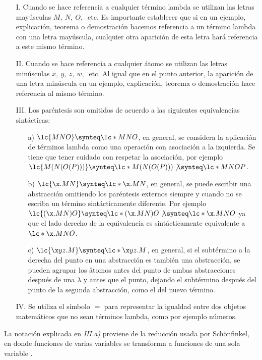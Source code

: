 \begin{itemize}
\item[I.] Cuando se hace referencia a cualquier término lambda se utilizan las
  letras mayúsculas \(M,\ N,\ O,\ \) etc. Es importante establecer que si en un
  ejemplo, explicación, teorema o demostración hacemos referencia a un término
  lambda con una letra mayúscula, cualquier otra aparición de esta letra hará
  referencia a este mismo término.
\item[II.] Cuando se hace referencia a cualquier átomo se utilizan las letras
  minúsculas \(x,\ y,\ z,\ w,\ \) etc. Al igual que en el punto anterior, la
  aparición de una letra minúscula en un ejemplo, explicación, teorema o
  demostración hace referencia al mismo término.
\item[III.] Los paréntesis son omitidos de acuerdo a las siguientes
  equivalencias sintácticas:
  \begin{itemize}
  \item[a)] \(\lc{M N O} \synteq \lc*{M N O}\), en general, se considera la
    aplicación de términos lambda como una operación con asociación a la
    izquierda. Se tiene que tener cuidado con respetar la asociación, por
    ejemplo \(\lc{M(N(O(P)))} \synteq \lc*{M(N(O(P)))} \not\synteq \lc*{M N O P}\).
  \item[b)] \(\lc{\x.M N} \synteq \lc*{\x.M N}\), en general, se puede escribir una
    abstracción omitiendo los paréntesis externos siempre y cuando no se escriba
    un término sintácticamente diferente. Por ejemplo \(\lc{(\x.M N) O} \synteq
    \lc*{(\x.M N) O} \not\synteq \lc*{\x.M N O}\) ya que el lado derecho de la
    equivalencia es sintácticamente equivalente a \(\lc*{\x.M N O}\).
  \item[c)] \(\lc{\x y z.M} \synteq \lc*{\x y z.M}\), en general, si el subtérmino a
    la derecha del punto en una abstracción es también una abstracción, se
    pueden agrupar los åtomos antes del punto de ambas abstracciones después de
    una \(\lambda\) y antes que el punto, dejando el subtérmino después del
    punto de la segunda abstracción, como el del nuevo término.
  \end{itemize}
\item[IV.] Se utiliza el símbolo \(=\) para representar la igualdad entre dos
  objetos matemáticos que no sean términos lambda, como por ejemplo números.
\end{itemize}

La notación explicada en \emph{III.a)} proviene de la reducción usada por
Schönfinkel, en donde funciones de varias variables se transformn a funciones
de una sola variable \cite{Schonfinkel:Varargs}.\\

